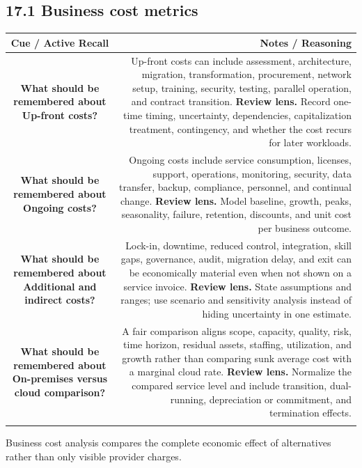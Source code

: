 \documentclass[11pt]{article}
\newcommand{\CornellHeader}{\rowcolor{Navy}\color{white}\bfseries Cue / Active Recall & \color{white}\bfseries Notes / Reasoning \\\endhead}
\newcommand{\CornellRow}[2]{\cellcolor{CueGray}\textbf{#1} & #2 \\\addlinespace[3pt]}
\begin{document}
\subsection{17.1 Business cost metrics}
\begin{longtable}{@{}C N@{}}
\CornellHeader
\CornellRow{What should be remembered about Up-front costs?}{Up-front costs can include assessment, architecture, migration, transformation, procurement, network setup, training, security, testing, parallel operation, and contract transition. \textbf{Review lens.} Record one-time timing, uncertainty, dependencies, capitalization treatment, contingency, and whether the cost recurs for later workloads.}
\CornellRow{What should be remembered about Ongoing costs?}{Ongoing costs include service consumption, licenses, support, operations, monitoring, security, data transfer, backup, compliance, personnel, and continual change. \textbf{Review lens.} Model baseline, growth, peaks, seasonality, failure, retention, discounts, and unit cost per business outcome.}
\CornellRow{What should be remembered about Additional and indirect costs?}{Lock-in, downtime, reduced control, integration, skill gaps, governance, audit, migration delay, and exit can be economically material even when not shown on a service invoice. \textbf{Review lens.} State assumptions and ranges; use scenario and sensitivity analysis instead of hiding uncertainty in one estimate.}
\CornellRow{What should be remembered about On-premises versus cloud comparison?}{A fair comparison aligns scope, capacity, quality, risk, time horizon, residual assets, staffing, utilization, and growth rather than comparing sunk average cost with a marginal cloud rate. \textbf{Review lens.} Normalize the compared service level and include transition, dual-running, depreciation or commitment, and termination effects.}
\end{longtable}
\begin{sectionsummarybox}
Business cost analysis compares the complete economic effect of alternatives rather than only visible provider charges.
\end{sectionsummarybox}
\end{document}
